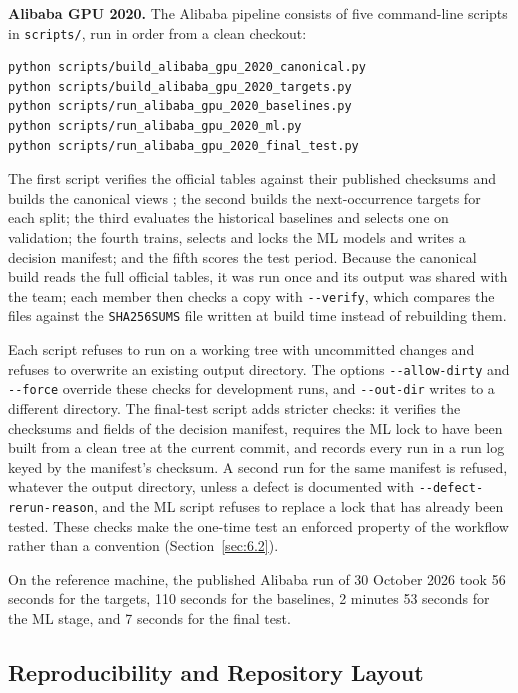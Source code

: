 \documentclass{IEEEtran}
\begin{document}
\textbf{Alibaba GPU 2020.} The Alibaba pipeline consists of five command-line scripts in \texttt{scripts/}, run in order from a clean checkout:

{\footnotesize
\begin{verbatim}
python scripts/build_alibaba_gpu_2020_canonical.py
python scripts/build_alibaba_gpu_2020_targets.py
python scripts/run_alibaba_gpu_2020_baselines.py
python scripts/run_alibaba_gpu_2020_ml.py
python scripts/run_alibaba_gpu_2020_final_test.py
\end{verbatim}
}

The first script verifies the official tables against their published checksums and builds the canonical views \cite{ref19}; the second builds the next-occurrence targets for each split; the third evaluates the historical baselines and selects one on validation; the fourth trains, selects and locks the ML models and writes a decision manifest; and the fifth scores the test period. Because the canonical build reads the full official tables, it was run once and its output was shared with the team; each member then checks a copy with \texttt{-\/-verify}, which compares the files against the \texttt{SHA256SUMS} file written at build time instead of rebuilding them.

Each script refuses to run on a working tree with uncommitted changes and refuses to overwrite an existing output directory. The options \texttt{-\/-allow-dirty} and \texttt{-\/-force} override these checks for development runs, and \texttt{-\/-out-dir} writes to a different directory. The final-test script adds stricter checks: it verifies the checksums and fields of the decision manifest, requires the ML lock to have been built from a clean tree at the current commit, and records every run in a run log keyed by the manifest's checksum. A second run for the same manifest is refused, whatever the output directory, unless a defect is documented with \texttt{-\/-defect-rerun-reason}, and the ML script refuses to replace a lock that has already been tested. These checks make the one-time test an enforced property of the workflow rather than a convention (Section~\ref{sec:6.2}).

On the reference machine, the published Alibaba run of 30 October 2026 took 56 seconds for the targets, 110 seconds for the baselines, 2 minutes 53 seconds for the ML stage, and 7 seconds for the final test.

\subsection{Reproducibility and Repository Layout}\label{sec:8.2}
\end{document}
